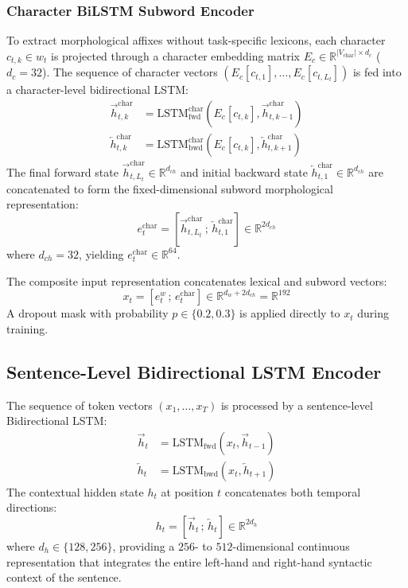 \documentclass[conference]{IEEEtran}
\begin{document}
\subsubsection{Character BiLSTM Subword Encoder}
To extract morphological affixes without task-specific lexicons, each character $c_{t, k} \in w_t$ is projected through a character embedding matrix $E_c \in \mathbb{R}^{|V_{\text{char}}| \times d_c}$ ($d_c = 32$). The sequence of character vectors $(E_c[c_{t, 1}], \dots, E_c[c_{t, L_t}])$ is fed into a character-level bidirectional LSTM:
\begin{align}
\overrightarrow{h}_{t, k}^{\text{char}} &= \text{LSTM}_{\text{fwd}}^{\text{char}}(E_c[c_{t, k}], \overrightarrow{h}_{t, k-1}^{\text{char}}) \\
\overleftarrow{h}_{t, k}^{\text{char}} &= \text{LSTM}_{\text{bwd}}^{\text{char}}(E_c[c_{t, k}], \overleftarrow{h}_{t, k+1}^{\text{char}})
\end{align}
The final forward state $\overrightarrow{h}_{t, L_t}^{\text{char}} \in \mathbb{R}^{d_{ch}}$ and initial backward state $\overleftarrow{h}_{t, 1}^{\text{char}} \in \mathbb{R}^{d_{ch}}$ are concatenated to form the fixed-dimensional subword morphological representation:
\begin{equation}
e_t^{\text{char}} = \left[ \overrightarrow{h}_{t, L_t}^{\text{char}} \,;\, \overleftarrow{h}_{t, 1}^{\text{char}} \right] \in \mathbb{R}^{2 d_{ch}}
\end{equation}
where $d_{ch} = 32$, yielding $e_t^{\text{char}} \in \mathbb{R}^{64}$.

The composite input representation concatenates lexical and subword vectors:
\begin{equation}
x_t = \left[ e_t^w \,;\, e_t^{\text{char}} \right] \in \mathbb{R}^{d_w + 2 d_{ch}} = \mathbb{R}^{192}
\end{equation}
A dropout mask with probability $p \in \{0.2, 0.3\}$ is applied directly to $x_t$ during training.

\subsection{Sentence-Level Bidirectional LSTM Encoder}
The sequence of token vectors $(x_1, \dots, x_T)$ is processed by a sentence-level Bidirectional LSTM:
\begin{align}
\overrightarrow{h}_t &= \text{LSTM}_{\text{fwd}}(x_t, \overrightarrow{h}_{t-1}) \\
\overleftarrow{h}_t &= \text{LSTM}_{\text{bwd}}(x_t, \overleftarrow{h}_{t+1})
\end{align}
The contextual hidden state $h_t$ at position $t$ concatenates both temporal directions:
\begin{equation}
h_t = \left[ \overrightarrow{h}_t \,;\, \overleftarrow{h}_t \right] \in \mathbb{R}^{2 d_h}
\end{equation}
where $d_h \in \{128, 256\}$, providing a $256$- to $512$-dimensional continuous representation that integrates the entire left-hand and right-hand syntactic context of the sentence.
\end{document}
